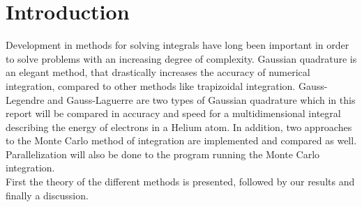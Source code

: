 \documentclass[../main.tex]{subfiles}
\begin{document}
\section{Introduction} \label{sec:intro}
Development in methods for solving integrals have long been important in order to solve problems with an increasing degree of complexity. Gaussian quadrature is an elegant method, that drastically increases the accuracy of numerical integration, compared to other methods like trapizoidal integration. Gauss-Legendre and Gauss-Laguerre are two types of Gaussian quadrature which in this report will be compared in accuracy and speed for a multidimensional integral describing the energy of electrons in a Helium atom. In addition, two approaches to the Monte Carlo method of integration are implemented and compared as well. Parallelization will also be done to the program running the Monte Carlo integration.\\

First the theory of the different methods is presented, followed by our results and finally a discussion.
\end{document}
